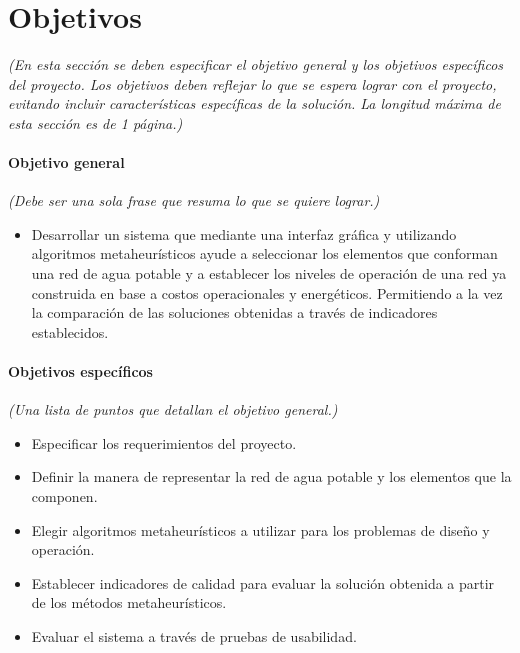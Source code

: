 \documentclass[11pt,letterpaper]{article}
\begin{document}
\section{Objetivos}
\emph{(En esta sección se deben especificar el objetivo general y los objetivos específicos del proyecto. Los objetivos deben reflejar lo que se espera lograr con el proyecto, evitando incluir características específicas de la solución. La longitud máxima de esta sección es de 1 página.)}

\paragraph{Objetivo general}
\emph{(Debe ser una sola frase que resuma lo que se quiere lograr.)} 
\begin{itemize}
\item Desarrollar un sistema que mediante una interfaz gráfica y utilizando algoritmos metaheurísticos ayude a seleccionar los elementos que conforman una red de agua potable y a establecer los niveles de operación de una red ya construida en base a costos operacionales y energéticos. Permitiendo a la vez la comparación de las soluciones obtenidas a través de indicadores establecidos.
\end{itemize}

\paragraph{Objetivos específicos} \emph{(Una lista de puntos que detallan el objetivo general.)}
\begin{itemize}
\item Especificar los requerimientos del proyecto.
\item Definir la manera de representar la red de agua potable y los elementos que la componen.
\item Elegir algoritmos metaheurísticos a utilizar para los problemas de diseño y operación.
\item Establecer indicadores de calidad para evaluar la solución obtenida a partir de los métodos metaheurísticos.
\item Evaluar el sistema a través de pruebas de usabilidad.
\end{itemize}
\end{document}
